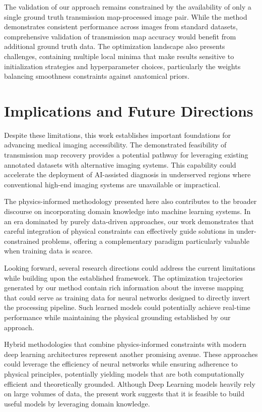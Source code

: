 \documentclass[nomenclature, english, bibtex]{kththesis}
\numberwithin{listing}{chapter}
\begin{document}
The validation of our approach remains constrained by the availability of only a single ground truth transmission map-processed image pair. While the method demonstrates consistent performance across images from standard datasets, comprehensive validation of transmission map accuracy would benefit from additional ground truth data. The optimization landscape also presents challenges, containing multiple local minima that make results sensitive to initialization strategies and hyperparameter choices, particularly the weights balancing smoothness constraints against anatomical priors.

\section{Implications and Future Directions}

Despite these limitations, this work establishes important foundations for advancing medical imaging accessibility. The demonstrated feasibility of transmission map recovery provides a potential pathway for leveraging existing annotated datasets with alternative imaging systems. This capability could accelerate the deployment of AI-assisted diagnosis in underserved regions where conventional high-end imaging systems are unavailable or impractical.

The physics-informed methodology presented here also contributes to the broader discourse on incorporating domain knowledge into machine learning systems. In an era dominated by purely data-driven approaches, our work demonstrates that careful integration of physical constraints can effectively guide solutions in under-constrained problems, offering a complementary paradigm particularly valuable when training data is scarce.

Looking forward, several research directions could address the current limitations while building upon the established framework. The optimization trajectories generated by our method contain rich information about the inverse mapping that could serve as training data for neural networks designed to directly invert the processing pipeline. Such learned models could potentially achieve real-time performance while maintaining the physical grounding established by our approach.

Hybrid methodologies that combine physics-informed constraints with modern deep learning architectures represent another promising avenue. These approaches could leverage the efficiency of neural networks while ensuring adherence to physical principles, potentially yielding models that are both computationally efficient and theoretically grounded. Although Deep Learning models heavily rely on large volumes of data, the present work suggests that it is feasible to build useful models by leveraging domain knowledge. 
\end{document}
